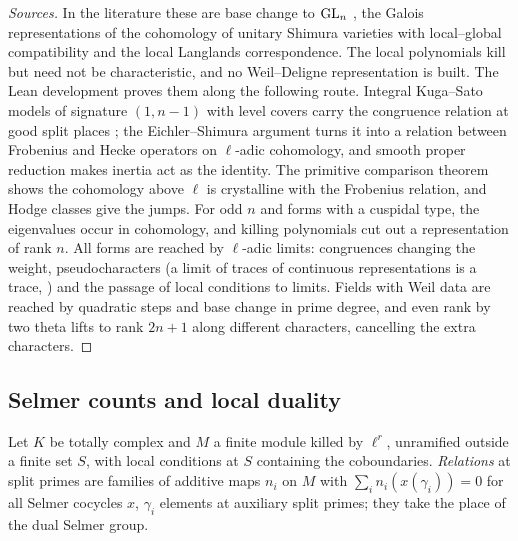 \begin{proof}[Sources]
In the literature these are base change to $\operatorname{GL}_n$ \cite{HarrisLabesse2004}, the Galois representations of the cohomology of unitary Shimura varieties with local--global compatibility
\cite{HarrisTaylor2001,Shin2011,ChenevierHarris2013,BLGGT2014} and the local Langlands correspondence. The local polynomials kill but need not be characteristic, and no Weil--Deligne representation is
built. The Lean development proves them along the following route. Integral Kuga--Sato models of signature $(1,n-1)$ with level covers carry the congruence relation at good split places
\cite{Kottwitz1992,HarrisTaylor2001}; the Eichler--Shimura argument \cite{Deligne1971} turns it into a relation between Frobenius and Hecke operators on $\ell$-adic cohomology, and smooth proper reduction
makes inertia act as the identity. The primitive comparison theorem \cite{Scholze2013} shows the cohomology above $\ell$ is crystalline with the Frobenius relation, and Hodge classes give the jumps. For odd $n$ and
forms with a cuspidal type, the eigenvalues occur in cohomology, and killing polynomials cut out a representation of rank $n$. All forms are reached by $\ell$-adic limits: congruences changing the weight,
pseudocharacters (a limit of traces of continuous representations is a trace, \cite{Taylor1991,Rouquier1996}) and the passage of local conditions to limits. Fields with Weil data are reached by quadratic steps
and base change in prime degree, and even rank by two theta lifts to rank $2n+1$ along different characters, cancelling the extra characters.
\end{proof}

\subsection{Selmer counts and local duality}\label{ss:B-greenberg-wiles}
Let $K$ be totally complex and $M$ a finite module killed by $\ell^r$, unramified outside a finite set $S$, with local conditions at $S$ containing the coboundaries. \emph{Relations} at split primes are families of
additive maps $n_i$ on $M$ with $\sum_in_i(x(\gamma_i))=0$ for all Selmer cocycles $x$, $\gamma_i$ elements at auxiliary split primes; they take the place of the dual Selmer group.


